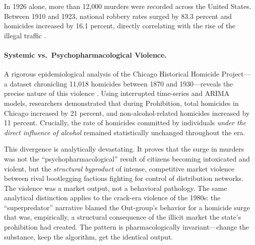 \documentclass[12pt,openany]{book}
\begin{document}
In 1926 alone, more than 12,000 murders were recorded across the United States. Between 1910 and 1923, national robbery rates surged by 83.3 percent and homicides increased by 16.1 percent, directly correlating with the rise of the illegal traffic \cite{newdeal_crime}.

\paragraph{Systemic vs.\ Psychopharmacological Violence.}
A rigorous epidemiological analysis of the Chicago Historical Homicide Project---a dataset chronicling 11,018 homicides between 1870 and 1930---reveals the precise nature of this violence \cite{asbridge2009}. Using interrupted time-series and ARIMA models, researchers demonstrated that during Prohibition, total homicides in Chicago increased by 21 percent, and non-alcohol-related homicides increased by 11 percent. Crucially, the rate of homicides committed by individuals \textit{under the direct influence of alcohol} remained statistically unchanged throughout the era.

This divergence is analytically devastating. It proves that the surge in murders was not the ``psychopharmacological'' result of citizens becoming intoxicated and violent, but the \textit{structural byproduct} of intense, competitive market violence between rival bootlegging factions fighting for control of distribution networks. The violence was a market output, not a behavioral pathology. The same analytical distinction applies to the crack-era violence of the 1980s: the ``superpredator'' narrative blamed the Out-group's behavior for a homicide surge that was, empirically, a structural consequence of the illicit market the state's prohibition had created. The pattern is pharmacologically invariant---change the substance, keep the algorithm, get the identical output.
\end{document}
